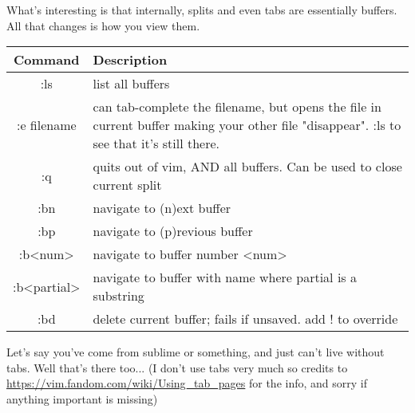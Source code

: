 \documentclass[12pt, letterpaper]{article}
\begin{document}
What's interesting is that internally, splits and even tabs are essentially
buffers. All that changes is how you view them.

\begin{table}[H]
    \begin{tabular}{|c|p{9cm}|}
        Command & Description \\
        \hline
        :ls & list all buffers \\
        \hline
        :e filename & can tab-complete the filename, but opens the file in
        current buffer making your other file "disappear". :ls to see that it's
        still there. \\
        \hline
        :q & quits out of vim, AND all buffers. Can be used to close current
        split \\
        \hline
        :bn & navigate to (n)ext buffer \\
        \hline
        :bp & navigate to (p)revious buffer \\
        \hline
        :b<num> & navigate to buffer number <num> \\
        \hline
        :b<partial> & navigate to buffer with name where partial is a substring
        \\
        \hline
        :bd & delete current buffer; fails if unsaved. add ! to override \\
        \hline
    \end{tabular}
\end{table}


Let's say you've come from sublime or something, and just can't live without
tabs. Well that's there too... (I don't use tabs very much so credits to
\url{https://vim.fandom.com/wiki/Using_tab_pages} for the info, and sorry if
anything important is missing)
\end{document}
